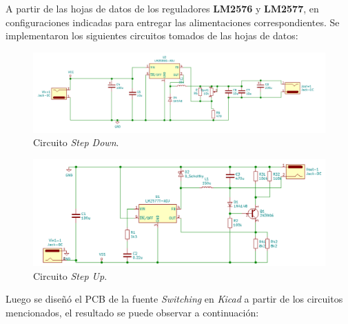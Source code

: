 \par A partir de las hojas de datos de los reguladores \textbf{LM2576} y \textbf{LM2577}, en configuraciones indicadas para entregar las alimentaciones correspondientes. Se implementaron los siguientes circuitos tomados de las hojas de datos:\\

\vfill

\clearpage

\begin{figure}[H]
    \centering
    \includegraphics[scale=0.48]{img/fuente/fuente_kicad_down.png}
    \caption{Circuito \textit{Step Down}.}
    \label{fig:step_down}
\end{figure}

\begin{figure}[H]
    \centering
    \includegraphics[scale=0.5]{img/fuente/fuente_kicad_up.png}
    \caption{Circuito \textit{Step Up}.}
    \label{fig:step_up}
\end{figure}

\par Luego se diseñó el PCB de la fuente \textit{Switching} en \textit{Kicad} a partir de los circuitos mencionados, el resultado se puede observar a continuación:\\


\vfill

\clearpage




